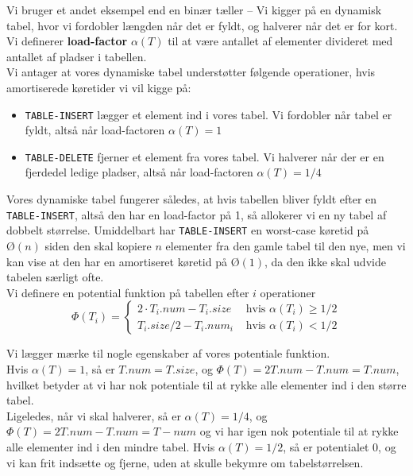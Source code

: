 Vi bruger et andet eksempel end en binær tæller -- Vi kigger på en dynamisk tabel, hvor vi fordobler længden når det er fyldt, og halverer når det er for kort. Vi definerer \textbf{load-factor} $\alpha (T)$ til at være antallet af elementer divideret med antallet af pladser i tabellen.\\
Vi antager at vores dynamiske tabel understøtter følgende operationer, hvis amortiserede køretider vi vil kigge på:
\begin{itemize}
\item \texttt{TABLE-INSERT} lægger et element ind i vores tabel. Vi fordobler når tabel er fyldt, altså når load-factoren $\alpha(T) = 1$
\item \texttt{TABLE-DELETE} fjerner et element fra vores tabel. Vi halverer når der er en fjerdedel ledige pladser, altså når load-factoren $\alpha(T) = 1/4$
\end{itemize}

Vores dynamiske tabel fungerer således, at hvis tabellen bliver fyldt efter en \texttt{TABLE-INSERT}, altså den har en load-factor på 1, så allokerer vi en ny tabel af dobbelt størrelse. Umiddelbart har \texttt{TABLE-INSERT} en worst-case køretid på $Ø(n)$ siden den skal kopiere $n$ elementer fra den gamle tabel til den nye, men vi kan vise at den har en amortiseret køretid på $Ø(1)$, da den ikke skal udvide tabelen særligt ofte.\\

Vi definere en potential funktion på tabellen efter $i$ operationer
\begin{equation*}
  \Phi(T_i) =
  \begin{cases}
    2 \cdot T_i.num - T_i.size & \text{ hvis } \alpha(T_i) \geq 1/2\\
    T_i.size/2 - T_i.num_i & \text{ hvis } \alpha(T_i) < 1/2
  \end{cases}
\end{equation*}

Vi lægger mærke til nogle egenskaber af vores potentiale funktion.\\
Hvis $\alpha(T) = 1$, så er $T.num = T.size$, og $\Phi(T) = 2T.num - T.num = T.num$, hvilket betyder at vi har nok potentiale til at rykke alle elementer ind i den større tabel.\\
Ligeledes, når vi skal halverer, så er $\alpha(T)=1/4$, og $\Phi(T) = 2T.num - T.num = T-num$ og vi har igen nok potentiale til at rykke alle elementer ind i den mindre tabel. Hvis $\alpha(T)=1/2$, så er potentialet 0, og vi kan frit indsætte og fjerne, uden at skulle bekymre om tabelstørrelsen.\\

